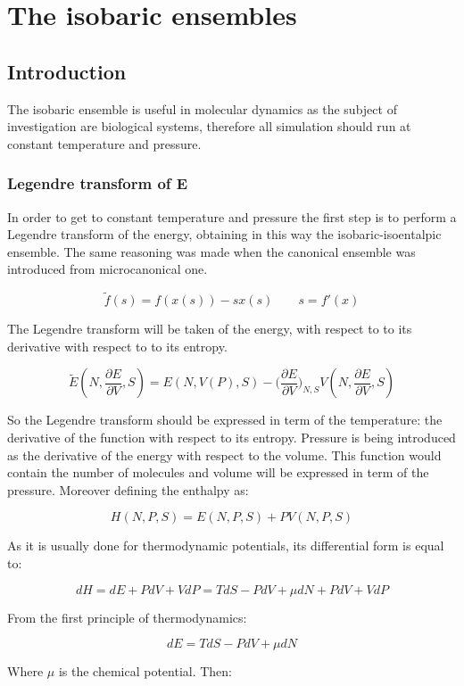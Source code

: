 \graphicspath{{chapters/12/images/}}
\chapter{The isobaric ensembles}

\section{Introduction}
The isobaric ensemble is useful in molecular dynamics as the subject of investigation are biological systems, therefore all simulation should run at constant temperature and pressure.

	\subsection{Legendre transform of E}
	In order to get to constant temperature and pressure the first step is to perform a Legendre transform of the energy, obtaining in this way the isobaric-isoentalpic ensemble.
	The same reasoning was made when the canonical ensemble was introduced from microcanonical one.

	$$\tilde{f}(s) = f(x(s))-sx(s)\qquad s = f'(x)$$

	The Legendre transform will be taken of the energy, with respect to to its derivative with respect to to its entropy.

	$$\tilde{E}(N, \frac{\partial E}{\partial V}, S) = E(N, V(P), S) - \biggl(\frac{\partial E}{\partial V}\biggr)_{N, S}V(N, \frac{\partial E}{\partial V}, S)$$

	So the Legendre transform should be expressed in term of the temperature: the derivative of the function with respect to its entropy.
	Pressure is being introduced as the derivative of the energy with respect to the volume.
	This function would contain the number of molecules and volume will be expressed in term of the pressure.
	Moreover defining the enthalpy as:

	$$H(N, P, S) = E(N, P, S) + PV(N, P, S)$$

	As it is usually done for thermodynamic potentials, its differential form is equal to:

	$$dH = dE + PdV + VdP = TdS - PdV + \mu dN + PdV + VdP$$

	From the first principle of thermodynamics:

	$$dE = TdS-PdV + \mu dN$$

	Where $\mu$ is the chemical potential.
	Then:

